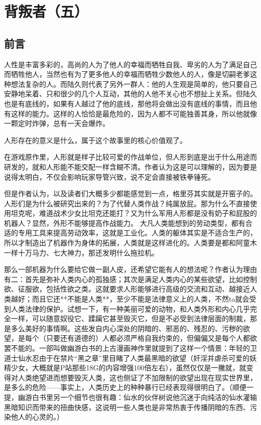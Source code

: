 \chapter{背叛者（五）}

\section*{前言}


人性是丰富多彩的，高尚的人为了他人的幸福而牺牲自我、卑劣的人为了满足自己而牺牲他人，当然也有为了更多他人的幸福而牺牲少数他人的人，像是切嗣老爹这种想法复杂的人。而陆久则代表了另外一群人：他的人生观是简单的，他只要自己安静地呆着、只和很少的几个人互动，其他的人他不关心也不想扯上关系。但陆久也是有底线的，如果有人越过了他的底线，那他将会做出没有底线的事情，而且他有这样的能力。这样的人恰恰是最危险的，因为人都不可能独善其身，所以他就像一颗定时炸弹，总有一天会爆炸。

\lineseparator


人形存在的意义是什么，属于这个故事里的核心价值观了。

在游戏原作里，人形就是样子比较可爱的作战单位，但人形到底是出于什么用途而研发的，就和人形能不能交配一样含糊不清。作者认为这是可以理解的，因为要是说得太明白，不仅会影响玩家导管兴致，说不定会直接被铁拳锤死。

但是作者认为，以及读者们大概多少都能感觉到一点，格里芬其实就是开窑子的。人形们是为什么被研究出来的？为了代替人类作战？纯属放屁。那为什么不直接使用坦克呢，难道战术少女比坦克还能打？又为什么军用人形都是没有奶子和屁股的机器人？显然，外形不能够提高作战能力。
大凡人类能想到的劳动类型，都有合适的专用工具来提高劳动效率，这就是工业化。人类的躯体其实是不适合生产的，所以才制造出了机器作为身体的拓展，人类就是这样进化的。人类要是都和阿童木一样十万马力、七大神力，那还发明什么拖拉机。

那么一部机器为什么要给它做一副人皮，还希望它能有人的想法呢？作者认为理由有二：首先是弥补人类内心的孤独感；其次是满足人类内心的某些欲望，比如控制欲、征服欲，包括性欲之类。这就要求人形能够进行高级的交流和互动、越接近人类越好；而且它还**不能是人类**，至少不能是法律意义上的人类，不然ta就会受到人类法律的保护。试想一下，有一种美丽可爱的动物，和人类外形和内心几乎完全一样，可以随意奴役它、蹂躏它甚至毁灭它，但是不必受到法律层面的制裁，那是多么美好的事情啊。这些发自内心深处的阴暗的、邪恶的、残忍的、污秽的欲望，是每个（只要还有道德的）人都必须严格自我约束的，但偏偏又是每个人都欲罢不能的。一部叫做幽游白书的上古漫画神作里就提到了这样一个情景：年轻的卫道士仙水忍由于在禁片“黑之章”里目睹了人类最黑暗的欲望（奸淫并虐杀可爱的妖精少女，大概就是P站那些18G的内容增强100倍左右），虽然仅仅是一撇就，就变得对人类绝望进而想要毁灭人类，这也侧证了不加限制的欲望出现在现实世界里，是多么的危险——事实上，人类历史上的种种暴行已经表现得很明白了。（顺便一提，幽游白书里另一个细节也很有趣：仙水的伙伴树说他沉迷于向纯洁的仙水灌输黑暗知识而带来的扭曲快感，这说明一些人类也是非常热衷于传播阴暗的东西、污染他人的心灵的。）

